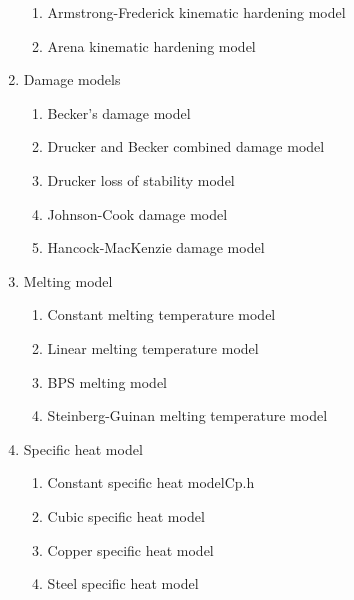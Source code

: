 \begin{enumerate}
\begin{enumerate}
    \item Armstrong-Frederick kinematic hardening model
    \item Arena kinematic hardening model
  \end{enumerate}
  \item Damage models
  \begin{enumerate}
    \item Becker's damage model
    \item Drucker and Becker combined damage model
    \item Drucker loss of stability model
    \item Johnson-Cook damage model
    \item Hancock-MacKenzie damage model
  \end{enumerate}
  \item Melting model
  \begin{enumerate}
    \item Constant melting temperature model
    \item Linear melting temperature model
    \item BPS melting model
    \item Steinberg-Guinan melting temperature model
  \end{enumerate}
  \item Specific heat model 
  \begin{enumerate}
    \item Constant specific heat modelCp.h
    \item Cubic specific heat model
    \item Copper specific heat model
    \item Steel specific heat model
  \end{enumerate}
\end{enumerate}

